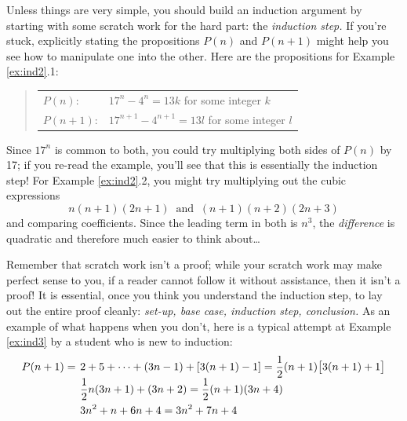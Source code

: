Unless things are very simple, you should build an induction argument by starting with some scratch work for the hard part: the \emph{induction step.} If you're stuck, explicitly stating the propositions $P(n)$ and $P(n+1)$ might help you see how to manipulate one into the other. Here are the propositions for Example \ref{ex:ind2}.1:
\begin{quote}
	\begin{tabular}{ll}
	$P(n)$: &$17^n-4^n=13k$ for some integer $k$\\[5pt]
	$P(n+1)$: &$17^{n+1}-4^{n+1}=13l$ for some integer $l$
	\end{tabular}
\end{quote}
Since $17^n$ is common to both, you could try multiplying both sides of $P(n)$ by 17; if you re-read the example, you'll see that this is essentially the induction step! For Example \ref*{ex:ind2}.2, you might try multiplying out the cubic expressions
\[
	n(n+1)(2n+1)\ \text{ and }\ (n+1)(n+2)(2n+3)
\]
and comparing coefficients. Since the leading term in both is $n^3$, the \emph{difference} is quadratic and therefore much easier to think about\ldots\smallbreak

Remember that scratch work isn't a proof; while your scratch work may make perfect sense to you, if a reader cannot follow it without assistance, then it isn't a proof! It is essential, once you think you understand the induction step, to lay out the entire proof cleanly: \emph{set-up, base case, induction step, conclusion.} As an example of what happens when you don't, here is a typical attempt at Example \ref{ex:ind3} by a student who is new to induction:

\begin{tcolorbox}[exstyle]\vspace{-10pt}
	\begin{align*}
		P(n+1)=\hspace{4pt}&2+5+\cdots+(3n-1)+[3(n+1)-1] =\smash{\frac 12}(n+1)\bigl[3(n+1)+1\bigr]\\
		&\frac 12n(3n+1)+(3n+2) =\frac 12(n+1)(3n+4)\\
		&3n^2+n+6n+4 =3n^2+7n+4
	\end{align*}
\end{tcolorbox}

